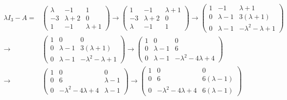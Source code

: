 \begin{solution}
  \begin{align*}
    \lambda I_3-A= &
    \begin{pmatrix}
      \lambda & -1 & 1\\
      -3 & \lambda+2 & 0\\
      1 & -1 & \lambda+1
    \end{pmatrix}\longrightarrow
    \begin{pmatrix}
      1 & -1 & \lambda+1\\
      -3 & \lambda+2 & 0\\
      \lambda & -1 & 1
    \end{pmatrix}\longrightarrow
    \begin{pmatrix}
      1 & -1 & \lambda+1\\
      0 & \lambda-1 & 3(\lambda+1)\\
      0 & \lambda-1 & -\lambda^2-\lambda+1
    \end{pmatrix}\\
    \longrightarrow &
                      \begin{pmatrix}
                        1 & 0 & 0\\
                        0 & \lambda-1 & 3(\lambda+1)\\
                        0 & \lambda-1 & -\lambda^2-\lambda+1
                      \end{pmatrix}\longrightarrow
                      \begin{pmatrix}
                        1 & 0 & 0\\
                        0 & \lambda -1 & 6\\
                        0 & \lambda-1 & -\lambda^2-4\lambda+4
                      \end{pmatrix}\\
   \longrightarrow &
                      \begin{pmatrix}
                        1 & 0 & 0\\
                        0 & 6 & \lambda-1\\
                        0 & -\lambda^2-4\lambda+4 & \lambda-1
                      \end{pmatrix}\longrightarrow
                     \begin{pmatrix}
                       1 & 0 & 0\\
                        0 & 6 & 6(\lambda-1)\\
                        0 & -\lambda^2-4\lambda+4 & 6(\lambda-1)

\end{pmatrix}
\end{align*}
\end{solution}
